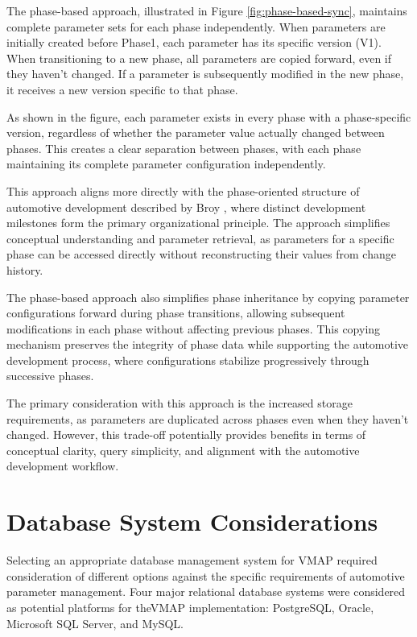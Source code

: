 The phase-based approach, illustrated in Figure \ref{fig:phase-based-sync}, maintains complete parameter sets for each phase independently. When parameters are initially created before Phase1, each parameter has its specific version (V1). When transitioning to a new phase, all parameters are copied forward, even if they haven't changed. If a parameter is subsequently modified in the new phase, it receives a new version specific to that phase.

As shown in the figure, each parameter exists in every phase with a phase-specific version, regardless of whether the parameter value actually changed between phases. This creates a clear separation between phases, with each phase maintaining its complete parameter configuration independently.

This approach aligns more directly with the phase-oriented structure of automotive development described by Broy \cite{broy2006challenges}, where distinct development milestones form the primary organizational principle. The approach simplifies conceptual understanding and parameter retrieval, as parameters for a specific phase can be accessed directly without reconstructing their values from change history.

The phase-based approach also simplifies phase inheritance by copying parameter configurations forward during phase transitions, allowing subsequent modifications in each phase without affecting previous phases. This copying mechanism preserves the integrity of phase data while supporting the automotive development process, where configurations stabilize progressively through successive phases.

The primary consideration with this approach is the increased storage requirements, as parameters are duplicated across phases even when they haven't changed. However, this trade-off potentially provides benefits in terms of conceptual clarity, query simplicity, and alignment with the automotive development workflow.

\section{Database System Considerations}
\label{sec:database-system-considerations}

Selecting an appropriate database management system for \ac{VMAP} required consideration of different options against the specific requirements of automotive parameter management. Four major relational database systems were considered as potential platforms for the\ac{VMAP} implementation: PostgreSQL, Oracle, Microsoft SQL Server, and MySQL.


